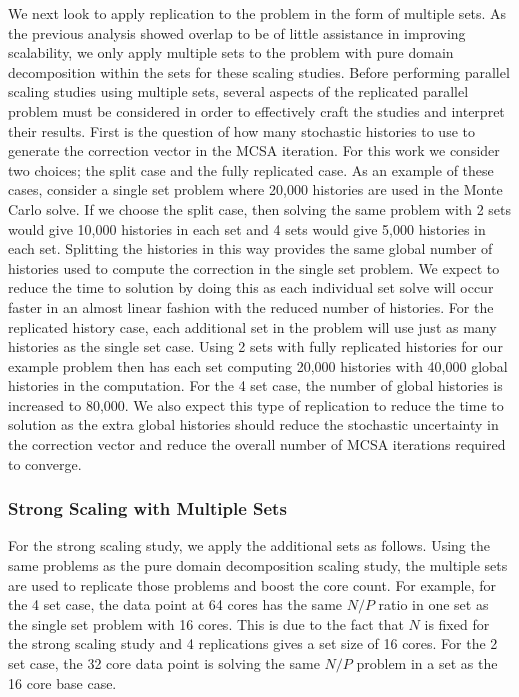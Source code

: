 We next look to apply replication to the problem in the form of
multiple sets. As the previous analysis showed overlap to be of little
assistance in improving scalability, we only apply multiple sets to
the problem with pure domain decomposition within the sets for these
scaling studies. Before performing parallel scaling studies using
multiple sets, several aspects of the replicated parallel problem must
be considered in order to effectively craft the studies and interpret
their results. First is the question of how many stochastic histories
to use to generate the correction vector in the MCSA iteration. For
this work we consider two choices; the split case and the fully
replicated case. As an example of these cases, consider a single set
problem where 20,000 histories are used in the Monte Carlo solve. If
we choose the split case, then solving the same problem with 2 sets
would give 10,000 histories in each set and 4 sets would give 5,000
histories in each set. Splitting the histories in this way provides
the same global number of histories used to compute the correction in
the single set problem. We expect to reduce the time to solution by
doing this as each individual set solve will occur faster in an almost
linear fashion with the reduced number of histories. For the
replicated history case, each additional set in the problem will use
just as many histories as the single set case. Using 2 sets with fully
replicated histories for our example problem then has each set
computing 20,000 histories with 40,000 global histories in the
computation. For the 4 set case, the number of global histories is
increased to 80,000. We also expect this type of replication to reduce
the time to solution as the extra global histories should reduce the
stochastic uncertainty in the correction vector and reduce the overall
number of MCSA iterations required to converge.

\subsubsection{Strong Scaling with Multiple Sets}
\label{subsubsec:ms_strong}

For the strong scaling study, we apply the additional sets as
follows. Using the same problems as the pure domain decomposition
scaling study, the multiple sets are used to replicate those problems
and boost the core count. For example, for the 4 set case, the data
point at 64 cores has the same $N/P$ ratio in one set as the single
set problem with 16 cores. This is due to the fact that $N$ is fixed
for the strong scaling study and 4 replications gives a set size of 16
cores. For the 2 set case, the 32 core data point is solving the same
$N/P$ problem in a set as the 16 core base case.

